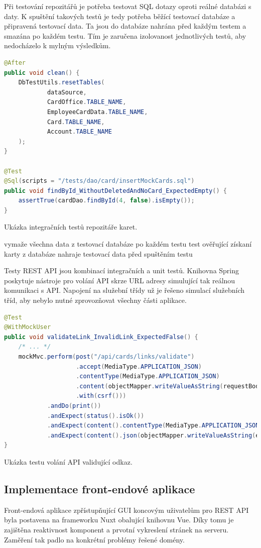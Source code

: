 		Při testování repozitářů je potřeba testovat \ac{SQL} dotazy oproti reálné databázi s daty.
		K spuštění takových testů je tedy potřeba běžící testovací databáze a připravená testovací data.
		Ta jsou do databáze nahrána před každým testem a smazána po každém testu.
		Tím je zaručena izolovanost jednotlivých testů, aby nedocházelo k mylným výsledkům.

		\begin{lstlisting}[language=Java]
@After
public void clean() {
	DbTestUtils.resetTables(
			dataSource,
			CardOffice.TABLE_NAME,
			EmployeeCardData.TABLE_NAME,
			Card.TABLE_NAME,
			Account.TABLE_NAME
	);
}

@Test
@Sql(scripts = "/tests/dao/card/insertMockCards.sql")
public void findById_WithoutDeletedAndNoCard_ExpectedEmpty() {
	assertTrue(cardDao.findById(4, false).isEmpty());
}
		\end{lstlisting}
		Ukázka integračních testů repozitáře karet. %

		vymaže všechna data z testovací databáze po každém testu
		test ověřující získaní karty z databáze
		nahraje testovací data před spuštěním testu

		Testy \ac{REST} \ac{API} jsou kombinací integračních a unit testů.
		Knihovna Spring poskytuje nástroje pro volání \ac{API} skrze \ac{URL} adresy simulující tak reálnou komunikaci
		s \ac{API}.
		Napojení na služební třídy už je řešeno simulací služebních tříd, aby nebylo nutné zprovozňovat všechny části
		aplikace.

		\begin{lstlisting}[language=Java]
@Test
@WithMockUser
public void validateLink_InvalidLink_ExpectedFalse() {
	/* ... */
	mockMvc.perform(post("/api/cards/links/validate")
					.accept(MediaType.APPLICATION_JSON)
					.contentType(MediaType.APPLICATION_JSON)
					.content(objectMapper.writeValueAsString(requestBody))
					.with(csrf()))
			.andDo(print())
			.andExpect(status().isOk())
			.andExpect(content().contentType(MediaType.APPLICATION_JSON))
			.andExpect(content().json(objectMapper.writeValueAsString(expectedResponseBody)));
}
		\end{lstlisting}
		Ukázka testu volání API validující odkaz. %

	\subsection{Implementace front-endové aplikace}

	Front-endová aplikace zpřístupňující \ac{GUI} koncovým uživatelům pro \ac{REST} \ac{API} byla postavena na frameworku
	Nuxt obalující knihovnu Vue.
	Díky tomu je zajištěna reaktivnost komponent a prvotní vykreslení stránek na serveru.
	Zaměření tak padlo na konkrétní problémy řešené domény.

